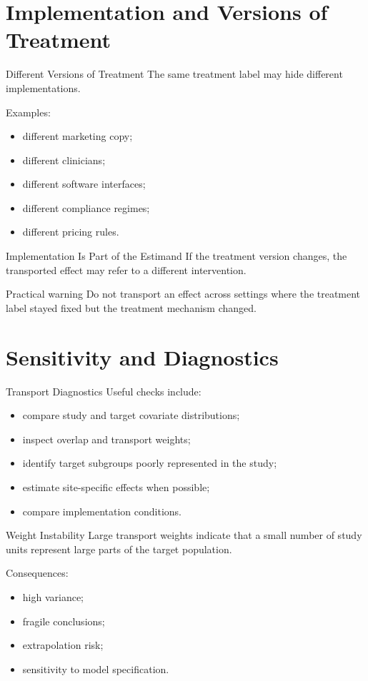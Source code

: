 \documentclass[aspectratio=169,11pt]{beamer}
\begin{document}
\section{Implementation and Versions of Treatment}

\begin{frame}{Different Versions of Treatment}
The same treatment label may hide different implementations.

Examples:
\begin{itemize}
\item different marketing copy;
\item different clinicians;
\item different software interfaces;
\item different compliance regimes;
\item different pricing rules.
\end{itemize}
\end{frame}

\begin{frame}{Implementation Is Part of the Estimand}
If the treatment version changes, the transported effect may refer to a different intervention.

\begin{alertblock}{Practical warning}
Do not transport an effect across settings where the treatment label stayed fixed but the treatment mechanism changed.
\end{alertblock}
\end{frame}

\section{Sensitivity and Diagnostics}

\begin{frame}{Transport Diagnostics}
Useful checks include:
\begin{itemize}
\item compare study and target covariate distributions;
\item inspect overlap and transport weights;
\item identify target subgroups poorly represented in the study;
\item estimate site-specific effects when possible;
\item compare implementation conditions.
\end{itemize}
\end{frame}

\begin{frame}{Weight Instability}
Large transport weights indicate that a small number of study units represent large parts of the target population.

Consequences:
\begin{itemize}
\item high variance;
\item fragile conclusions;
\item extrapolation risk;
\item sensitivity to model specification.
\end{itemize}
\end{frame}
\end{document}

